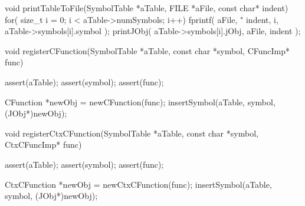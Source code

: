 void printTableToFile(SymbolTable *aTable, FILE *aFile, const char* indent) {
  for( size_t i = 0; i < aTable->numSymbols; i++) {
    fprintf(
      aFile,
      "%
      indent,
      i,
      aTable->symbols[i].symbol
    );
    printJObj(
      aTable->symbols[i].jObj,
      aFile,
      indent
    );
  }
}

void registerCFunction(SymbolTable *aTable, const char *symbol, CFuncImp* func) {
  assert(aTable);
  assert(symbol);
  assert(func);
  
  CFunction *newObj = newCFunction(func);
  insertSymbol(aTable, symbol, (JObj*)newObj);
}

void registerCtxCFunction(SymbolTable *aTable, const char *symbol, CtxCFuncImp* func) {
  assert(aTable);
  assert(symbol);
  assert(func);
  
  CtxCFunction *newObj = newCtxCFunction(func);
  insertSymbol(aTable, symbol, (JObj*)newObj);
}

\stopCCode

